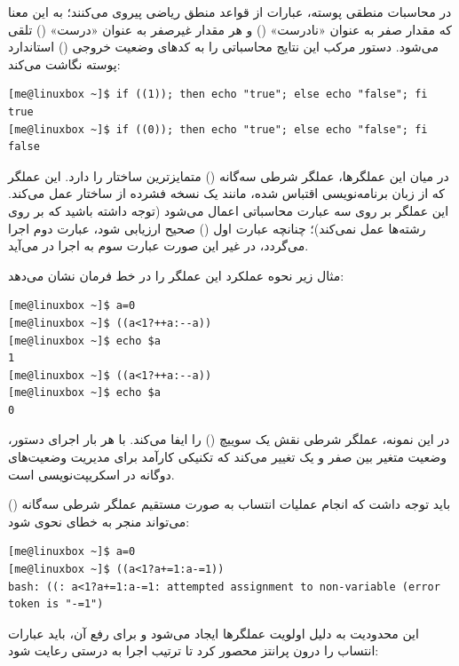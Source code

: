در محاسبات منطقی پوسته، عبارات از قواعد منطق ریاضی پیروی می‌کنند؛ به این معنا که مقدار صفر به عنوان «نادرست» () و هر مقدار غیرصفر به عنوان «درست» () تلقی می‌شود. دستور مرکب \cmd{(( ))} این نتایج محاسباتی را به کدهای وضعیت خروجی () استاندارد پوسته نگاشت می‌کند:

\begin{latin}
\begin{lstlisting}
[me@linuxbox ~]$ if ((1)); then echo "true"; else echo "false"; fi
true
[me@linuxbox ~]$ if ((0)); then echo "true"; else echo "false"; fi
false
\end{lstlisting}
\end{latin}

در میان این عملگرها، عملگر شرطی سه‌گانه () متمایزترین ساختار را دارد. این عملگر که از زبان برنامه‌نویسی  اقتباس شده، مانند یک نسخه فشرده از ساختار  عمل می‌کند. این عملگر بر روی سه عبارت محاسباتی اعمال می‌شود (توجه داشته باشید که بر روی رشته‌ها عمل نمی‌کند)؛ چنانچه عبارت اول () صحیح ارزیابی شود، عبارت دوم اجرا می‌گردد، در غیر این صورت عبارت سوم به اجرا در می‌آید.

مثال زیر نحوه عملکرد این عملگر را در خط فرمان نشان می‌دهد:

\begin{latin}
\begin{lstlisting}
[me@linuxbox ~]$ a=0
[me@linuxbox ~]$ ((a<1?++a:--a))
[me@linuxbox ~]$ echo $a
1
[me@linuxbox ~]$ ((a<1?++a:--a))
[me@linuxbox ~]$ echo $a
0
\end{lstlisting}
\end{latin}

در این نمونه، عملگر شرطی نقش یک سوییچ () را ایفا می‌کند. با هر بار اجرای دستور، وضعیت متغیر  بین صفر و یک تغییر می‌کند که تکنیکی کارآمد برای مدیریت وضعیت‌های دوگانه در اسکریپت‌نویسی است.

باید توجه داشت که انجام عملیات انتساب به صورت مستقیم عملگر شرطی سه‌گانه () می‌تواند منجر به خطای نحوی شود:

\begin{latin}
\begin{lstlisting}
[me@linuxbox ~]$ a=0
[me@linuxbox ~]$ ((a<1?a+=1:a-=1))
bash: ((: a<1?a+=1:a-=1: attempted assignment to non-variable (error token is "-=1")
\end{lstlisting}
\end{latin}

این محدودیت به دلیل اولویت عملگرها ایجاد می‌شود و برای رفع آن، باید عبارات انتساب را درون پرانتز محصور کرد تا ترتیب اجرا به درستی رعایت شود:

